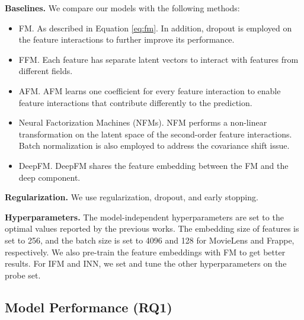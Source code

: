 \documentclass[letterpaper]{article} \usepackage{aaai19}  \usepackage{times}  \usepackage{helvet}  \usepackage{courier}  \usepackage{url}  \usepackage{graphicx}  \frenchspacing  \setlength{\pdfpagewidth}{8.5in}  \setlength{\pdfpageheight}{11in}  \usepackage{mathtools}
\begin{document}
\textbf{Baselines.} We compare our models with the following methods:

\begin{itemize}
\item FM\cite{rendle2010factorization}. As described in Equation \ref{eq:fm}. In addition, dropout is employed on the feature interactions 
to further improve its performance.
\item FFM\cite{juan2016field}. Each feature has separate latent vectors to interact with features from different fields. 
\item AFM\cite{xiaoattentional}. AFM learns one coefficient for every feature interaction to enable feature interactions that contribute differently to the prediction. 
\item Neural Factorization Machines (NFMs)\cite{he2017neural}. NFM performs a non-linear transformation on the latent space of the second-order feature interactions. Batch normalization\cite{ioffe2015batch} is also employed 
to address the covariance shift issue.


\item DeepFM\cite{guo2017deepfm}. DeepFM shares the feature embedding between the FM and the deep component.
\end{itemize} 

\textbf{Regularization.} We use  regularization, dropout, and early stopping.

\textbf{Hyperparameters.} The model-independent hyperparameters are set to the optimal values reported by the previous works\cite{xiaoattentional,he2017neural}. The embedding size of features is set to 256, and the batch size is set to 4096 and 128 for MovieLens and Frappe, respectively. We also pre-train the feature embeddings
with FM to get better results. For IFM and INN, we set  and tune the other hyperparameters on the probe set. 




\subsection{Model Performance (\textbf{RQ1})}
\end{document}

